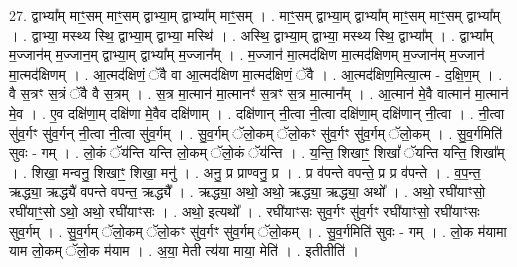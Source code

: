 \documentclass[17pt]{extarticle}
\begin{document}
27. द्वाभ्या᳚म् माꣳ॒॒सम् माꣳ॒॒सम् द्वाभ्या॒म् द्वाभ्या᳚म् माꣳ॒॒सम् । . माꣳ॒॒सम् द्वाभ्या॒म् द्वाभ्या᳚म् माꣳ॒॒सम् माꣳ॒॒सम् द्वाभ्या᳚म् । . द्वाभ्या॒ मस्थ्य स्थि॒ द्वाभ्या॒म् द्वाभ्या॒ मस्थि॑ । . अस्थि॒ द्वाभ्या॒म् द्वाभ्या॒ मस्थ्य स्थि॒ द्वाभ्या᳚म् । . द्वाभ्या᳚म् म॒ज्जान॑म् म॒ज्जान॒म् द्वाभ्या॒म् द्वाभ्या᳚म् म॒ज्जान᳚म् । . म॒ज्जान॑ मा॒त्मद॑क्षिण मा॒त्मद॑क्षिणम् म॒ज्जान॑म् म॒ज्जान॑ मा॒त्मद॑क्षिणम् । . आ॒त्मद॑क्षिणं॒ ॅवै वा आ॒त्मद॑क्षिण मा॒त्मद॑क्षिणं॒ ॅवै । . आ॒त्मद॑क्षिण॒मित्या॒त्म - द॒क्षि॒ण॒म् । . वै स॒त्रꣳ स॒त्रं ॅवै वै स॒त्रम् । . स॒त्र मा॒त्मान॑ मा॒त्मानꣳ॑ स॒त्रꣳ स॒त्र मा॒त्मान᳚म् । . आ॒त्मान॑ मे॒वै वात्मान॑ मा॒त्मान॑ मे॒व । . ए॒व दक्षि॑णा॒म् दक्षि॑णा मे॒वैव दक्षि॑णाम् । . दक्षि॑णान् नी॒त्वा नी॒त्वा दक्षि॑णा॒म् दक्षि॑णान् नी॒त्वा । . नी॒त्वा सु॑व॒र्गꣳ सु॑व॒र्गन् नी॒त्वा नी॒त्वा सु॑व॒र्गम् । . सु॒व॒र्गम् ॅलो॒कम् ॅलो॒कꣳ सु॑व॒र्गꣳ सु॑व॒र्गम् ॅलो॒कम् । . सु॒व॒र्गमिति॑ सुवः - गम् । . लो॒कं ॅय॑न्ति यन्ति लो॒कम् ॅलो॒कं ॅय॑न्ति । . य॒न्ति॒ शिखाꣳ॒॒ शिखां᳚ ॅयन्ति यन्ति॒ शिखा᳚म् । . शिखा॒ मन्वनु॒ शिखाꣳ॒॒ शिखा॒ मनु॑ । . अनु॒ प्र प्राण्वनु॒ प्र । . प्र व॑पन्ते वपन्ते॒ प्र प्र व॑पन्ते । . व॒प॒न्त॒ ऋद्ध्या॒ ऋद्ध्यै॑ वपन्ते वपन्त॒ ऋद्ध्यै᳚ । . ऋद्ध्या॒ अथो॒ अथो॒ ऋद्ध्या॒ ऋद्ध्या॒ अथो᳚ । . अथो॒ रघी॑याꣳसो॒ रघी॑याꣳ॒॒सो ऽथो॒ अथो॒ रघी॑याꣳसः । . अथो॒ इत्यथो᳚ । . रघी॑याꣳसः सुव॒र्गꣳ सु॑व॒र्गꣳ रघी॑याꣳसो॒ रघी॑याꣳसः सुव॒र्गम् । . सु॒व॒र्गम् ॅलो॒कम् ॅलो॒कꣳ सु॑व॒र्गꣳ सु॑व॒र्गम् ॅलो॒कम् । . सु॒व॒र्गमिति॑ सुवः - गम् । . लो॒क म॑यामा याम लो॒कम् ॅलो॒क म॑याम । . अ॒या॒ मेती त्य॑या माया॒ मेति॑ । . इतीतीति॑ । \newline
\end{document}
